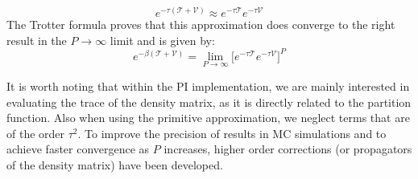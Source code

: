         \begin{equation} \label{primitiveApprox}
            e^{- \tau (\mathcal{T} + \mathcal{V})} \approx e^{- \tau \mathcal{T}} e^{- \tau \mathcal{V}}
        \end{equation}
        The Trotter formula proves that this approximation does converge to the right result in the $P \to \infty$ limit and is given by:
        \begin{equation} \label{trotter}
            e^{- \beta (\mathcal{T} + \mathcal{V})} = \lim_{P \to \infty} \Big[ e^{- \tau \mathcal{T}} e^{- \tau \mathcal{V}} \Big]^P
        \end{equation}

        It is worth noting that within the PI implementation, we are mainly interested in evaluating the trace of the density matrix, as it is directly related to the partition function. Also when using the primitive approximation, we neglect terms that are of the order $\tau^2$. To improve the precision of results in MC simulations and to achieve faster convergence as $P$ increases, higher order corrections (or propagators of the density matrix) have been developed.

